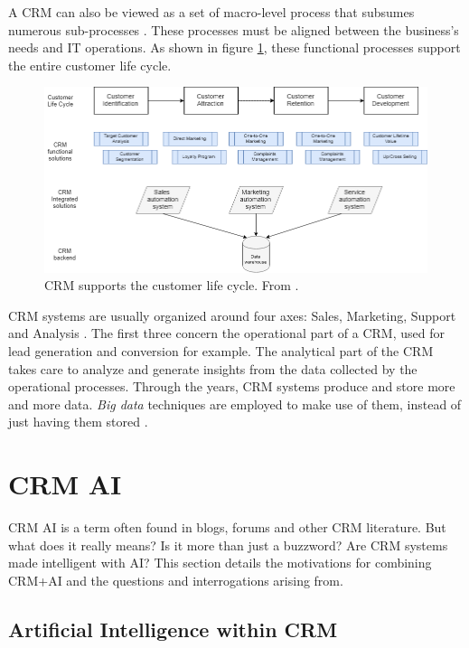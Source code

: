 A CRM can also be viewed as a set of macro-level process that subsumes numerous sub-processes \cite{crm-processes}. These processes must be aligned between the business's needs and IT operations. As shown in figure \ref{fig:crm-clc}, these functional processes support the entire customer life cycle.

\begin{figure}[h]
    \centering
    \includegraphics[width=12cm]{images/CRM-CustomerLifeCycle.png}
    \caption[CRM supports the customer life cycle]{CRM supports the customer life cycle. From \cite{DataAnalyticsinCRMProcessesALiteratureReview}.}
    \label{fig:crm-clc}
\end{figure}

CRM systems are usually organized around four axes: Sales, Marketing, Support and Analysis \cite{crm-def}. The first three concern the operational part of a CRM, used for lead generation and conversion for example. The analytical part of the CRM takes care to analyze and generate insights from the data collected by the operational processes. Through the years, CRM systems produce and store more and more data. \textit{Big data} techniques are employed to make use of them, instead of just having them stored \cite{peel-et-al}.


\section{CRM AI}

CRM AI is a term often found in blogs, forums and other CRM literature. But what does it really means? Is it more than just a buzzword? Are CRM systems made intelligent with AI? This section details the motivations for combining CRM+AI and the questions and interrogations arising from.

\subsection{Artificial Intelligence within CRM}

